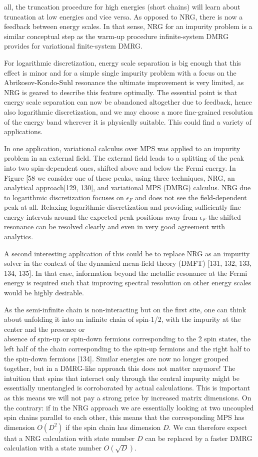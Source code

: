 \documentclass[12pt]{article}
\begin{document}
all, the truncation procedure for high energies (short chains) will learn about truncation at low energies and vice versa. As opposed to NRG, there is now a feedback between energy scales. In that sense, NRG for an impurity problem is a similar conceptual step as the warm-up procedure infinite-system DMRG provides for variational finite-system DMRG.

For logarithmic discretization, energy scale separation is big enough that this effect is minor and for a simple single impurity problem with a focus on the Abrikosov-Kondo-Suhl resonance the ultimate improvement is very limited, as NRG is geared to describe this feature optimally. The essential point is that energy scale separation can now be abandoned altogether due to feedback, hence also logarithmic discretization, and we may choose a more fine-grained resolution of the energy band wherever it is physically suitable. This could find a variety of applications.

In one application, variational calculus over MPS was applied to an impurity problem in an external field. The external field leads to a splitting of the peak into two spin-dependent ones, shifted above and below the Fermi energy. In Figure [58 we consider one of these peaks, using three techniques, NRG, an analytical approach[129, 130], and variational MPS (DMRG) calculus. NRG due to logarithmic discretization focuses on $\epsilon_{F}$ and does not see the field-dependent peak at all. Relaxing logarithmic discretization and providing sufficiently fine energy intervals around the expected peak positions away from $\epsilon_{F}$ the shifted resonance can be resolved clearly and even in very good agreement with analytics.

A second interesting application of this could be to replace NRG as an impurity solver in the context of the dynamical mean-field theory (DMFT) [131, 132, 133, 134, 135]. In that case, information beyond the metallic resonance at the Fermi energy is required such that improving spectral resolution on other energy scales would be highly desirable.

As the semi-infinite chain is non-interacting but on the first site, one can think about unfolding it into an infinite chain of spin-1/2, with the impurity at the center and the presence or\\
absence of spin-up or spin-down fermions corresponding to the 2 spin states, the left half of the chain corresponding to the spin-up fermions and the right half to the spin-down fermions [134]. Similar energies are now no longer grouped together, but in a DMRG-like approach this does not matter anymore! The intuition that spins that interact only through the central impurity might be essentially unentangled is corroborated by actual calculations. This is important as this means we will not pay a strong price by increased matrix dimensions. On the contrary: if in the NRG approach we are essentially looking at two uncoupled spin chains parallel to each other, this means that the corresponding MPS has dimension $O\left(D^{2}\right)$ if the spin chain has dimension $D$. We can therefore expect that a NRG calculation with state number $D$ can be replaced by a faster DMRG calculation with a state number $O(\sqrt{D})$.
\end{document}
